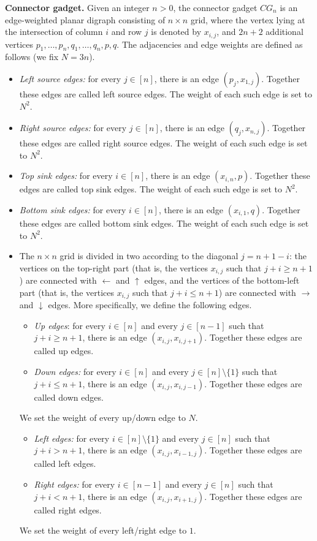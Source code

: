 \noindent
\textbf{Connector gadget.} Given an integer $n > 0$, the connector gadget $CG_n$ is an edge-weighted planar digraph consisting of $n \times n$ grid, where the vertex lying at the intersection of column $i$ and row $j$ is denoted by $x_{i,j}$, and $2n+2$ additional vertices $p_1,\ldots,p_n,q_1,\ldots,q_n,p,q$. The adjacencies and edge weights are defined as follows (we fix $N = 3n$).
\begin{itemize}
\item \emph{Left source edges:} for every $j \in [n]$, there is an edge $(p_j,x_{1,j})$. Together these edges are called left source edges. The weight of each such edge is set to $N^2$.
\item \emph{Right source edges:} for every $j \in [n]$, there is an edge $(q_j,x_{n,j})$. Together these edges are called right source edges. The weight of each such edge is set to $N^2$.
\item \emph{Top sink edges:} for every $i \in [n]$, there is an edge $(x_{i,n},p)$. Together these edges are called top sink edges. The weight of each such edge is set to $N^2$.
\item \emph{Bottom sink edges:} for every $i \in [n]$, there is an edge $(x_{i,1},q)$. Together these edges are called bottom sink edges. The weight of each such edge is set to $N^2$.
\item The $n \times n$ grid is divided in two according to the diagonal $j = n+1-i$: the vertices on the top-right part (that is, the vertices $x_{i,j}$ such that $j+i \geq n+1$) are connected with $\leftarrow$ and $\uparrow$ edges, and the vertices of the bottom-left part (that is, the vertices $x_{i,j}$ such that $j+i \leq n+1$) are connected with $\rightarrow$ and $\downarrow$ edges. More specifically, we define the following edges.
\begin{itemize}
\item \emph{Up edges}: for every $i \in [n]$ and every $j \in [n-1]$ such that $j+i \geq n+1$, there is an edge $(x_{i,j},x_{i,j+1})$. Together these edges are called up edges.
\item \emph{Down edges:} for every $i \in [n]$ and every $j \in [n] \setminus \{1\}$ such that $j+i \leq n+1$, there is an edge $(x_{i,j},x_{i,j-1})$. Together these edges are called down edges.
\end{itemize}
We set the weight of every up/down edge to $N$.
\begin{itemize}
\item \emph{Left edges:} for every $i \in [n] \setminus \{1\}$ and every $j \in [n]$ such that $j+i > n+1$, there is an edge $(x_{i,j},x_{i-1,j})$. Together these edges are called left edges.
\item \emph{Right edges:} for every $i \in [n-1]$ and every $j \in [n]$ such that $j+i < n+1$, there is an edge $(x_{i,j},x_{i+1,j})$. Together these edges are called right edges.
\end{itemize}
We set the weight of every left/right edge to $1$.
\end{itemize}  

